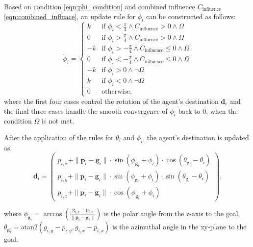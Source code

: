         Based on condition \eqref{eqn:phi_condition} and combined influence $C_{\text{influence}}$ \eqref{eqn:combined_influace}, an update rule for $\phi_i$ can be constructed as follows:
        \begin{equation}
            \label{eqn:phi_update}
            \dot{\phi}_i = 
            \begin{cases}
                k  & \text{if } \phi_i < \frac{\pi}{4} \land C_{\text{influence}} > 0 \land \Omega \\
                0  & \text{if } \phi_i > \frac{\pi}{4} \land C_{\text{influence}} > 0 \land \Omega \\
                -k & \text{if } \phi_i > -\frac{\pi}{4} \land C_{\text{influence}} \leq 0 \land \Omega \\
                0  & \text{if } \phi_i < -\frac{\pi}{4} \land C_{\text{influence}} \leq 0 \land \Omega \\
                -k & \text{if } \phi_i > 0 \land \neg \Omega \\
                k  & \text{if } \phi_i < 0 \land \neg \Omega \\
                0  & \text{otherwise}\text{,}
            \end{cases}
        \end{equation}
        where the first four cases control the rotation of the agent's destination $\mathbf{d}_i$ and the final three cases handle the smooth convergence of $\phi_i$ back to 0, when the condition $\Omega$ is not met. 

        After the application of the rules for $\theta_i$ and $\phi_i$, the agent's destination is updated as:
        \begin{equation}
            \label{eqn:destination_update}
            \mathbf{d}_i =
            \begin{pmatrix}
                p_{i,x} +  \|\mathbf{p}_i - \mathbf{g}_i\| \cdot \sin(\phi_{\mathbf{g}_i} + \phi_i) \cdot \cos(\theta_{\mathbf{g}_i} - \theta_i) \\
                p_{i,y} + \|\mathbf{p}_i - \mathbf{g}_i\| \cdot \sin(\phi_{\mathbf{g}_i} + \phi_i) \cdot \sin(\theta_{\mathbf{g}_i} - \theta_i) \\
                p_{i,z} + \|\mathbf{p}_i - \mathbf{g}_i\| \cdot \cos(\phi_{\mathbf{g}_i} + \phi_i)
            \end{pmatrix}\text{,}
        \end{equation}

        where $\phi_{\mathbf{g}_i} = \arccos(\frac{\mathbf{g}_{i,z} - \mathbf{p}_{i,z}}{\|\mathbf{p}_i - \mathbf{g}_i\|})$ is the polar angle from the z-axis to the goal, 
        $\theta_{\mathbf{g}_i} = \text{atan2}( g_{i,y} - p_{i,y}, g_{i,x} - p_{i,x})$ is the azimuthal angle in the xy-plane to the goal.
    
